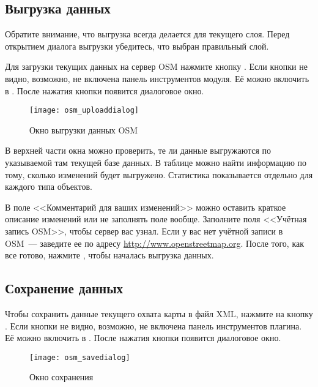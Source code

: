 \subsection{Выгрузка данных}

Обратите внимание, что выгрузка всегда делается для текущего слоя. Перед
открытием диалога выгрузки убедитесь, что выбран правильный слой.

Для загрузки текущих данных на сервер OSM нажмите кнопку
. Если кнопки не видно,
возможно, не включена панель инструментов модуля. Её можно включить
в  \arrow {} \arrow
{}. После нажатия кнопки 
появится диалоговое окно.

\begin{figure}[ht]
   \centering
   \texttt{[image: osm\_uploaddialog]}
   \caption{Окно выгрузки данных OSM \wincaption}\label{fig:osmupload}
\end{figure}

В верхней части окна можно проверить, те ли данные выгружаются по
указываемой там текущей базе данных. В таблице можно найти информацию по
тому, сколько изменений будет выгружено. Статистика показывается
отдельно для каждого типа объектов.

В поле <<Комментарий для ваших изменений>> можно оставить краткое
описание изменений или не заполнять поле вообще. Заполните поля
<<Учётная запись OSM>>, чтобы сервер вас узнал. Если у вас нет учётной
записи в OSM~--- заведите ее по адресу \url{http://www.openstreetmap.org}.
После того, как все готово, нажмите , чтобы началась
выгрузка данных.

\subsection{Сохранение данных}

Чтобы сохранить данные текущего охвата карты в файл XML, нажмите на кнопку
. Если кнопки не видно, возможно,
не включена панель инструментов плагина. Её можно включить в
 \arrow {} \arrow
{}. После нажатия кнопки появится диалоговое
окно.

\begin{figure}[ht]
   \centering
   \texttt{[image: osm\_savedialog]}
   \caption{Окно сохранения \wincaption}\label{fig:osmsave}
\end{figure}

